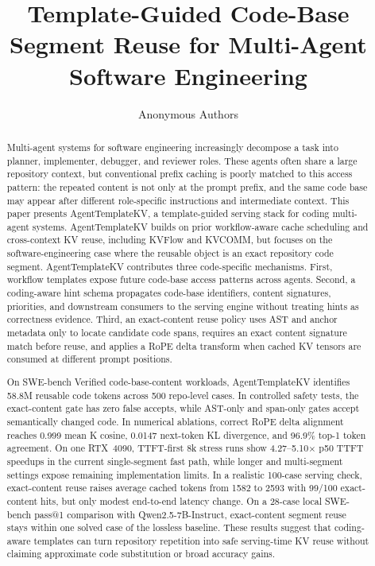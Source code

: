 \documentclass[sigplan,10pt,anonymous,review]{acmart}
\title{Template-Guided Code-Base Segment Reuse for Multi-Agent Software Engineering}
\author{Anonymous Authors}
\affiliation{\institution{Anonymous Institution}}
\newcommand{\system}{AgentTemplateKV\xspace}
\newcommand{\kvcomm}{KVCOMM\xspace}
\begin{document}
\begin{abstract}
Multi-agent systems for software engineering increasingly decompose a task into planner, implementer, debugger, and reviewer roles.
These agents often share a large repository context, but conventional prefix caching is poorly matched to this access pattern: the repeated content is not only at the prompt prefix, and the same code base may appear after different role-specific instructions and intermediate context.
This paper presents \system, a template-guided serving stack for coding multi-agent systems.
\system builds on prior workflow-aware cache scheduling and cross-context KV reuse, including KVFlow and \kvcomm, but focuses on the software-engineering case where the reusable object is an exact repository code segment.
\system contributes three code-specific mechanisms.
First, workflow templates expose future code-base access patterns across agents.
Second, a coding-aware hint schema propagates code-base identifiers, content signatures, priorities, and downstream consumers to the serving engine without treating hints as correctness evidence.
Third, an exact-content reuse policy uses AST and anchor metadata only to locate candidate code spans, requires an exact content signature match before reuse, and applies a RoPE delta transform when cached KV tensors are consumed at different prompt positions.

On SWE-bench Verified code-base-content workloads, \system identifies 58.8M reusable code tokens across 500 repo-level cases.
In controlled safety tests, the exact-content gate has zero false accepts, while AST-only and span-only gates accept semantically changed code.
In numerical ablations, correct RoPE delta alignment reaches 0.999 mean K cosine, 0.0147 next-token KL divergence, and 96.9\% top-1 token agreement.
On one RTX~4090, TTFT-first 8k stress runs show 4.27--5.10$\times$ p50 TTFT speedups in the current single-segment fast path, while longer and multi-segment settings expose remaining implementation limits.
In a realistic 100-case serving check, exact-content reuse raises average cached tokens from 1582 to 2593 with 99/100 exact-content hits, but only modest end-to-end latency change.
On a 28-case local SWE-bench pass@1 comparison with Qwen2.5-7B-Instruct, exact-content segment reuse stays within one solved case of the lossless baseline.
These results suggest that coding-aware templates can turn repository repetition into safe serving-time KV reuse without claiming approximate code substitution or broad accuracy gains.
\end{abstract}
\end{document}
